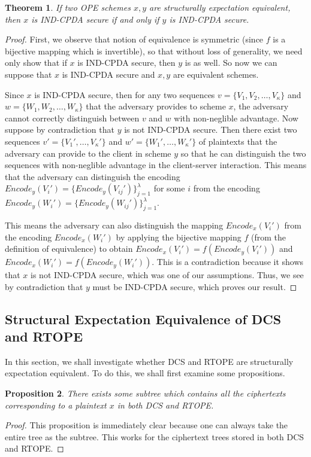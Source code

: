 \documentclass[12pt]{article}
\newtheorem{theorem}{Theorem}
\newtheorem{proposition}[theorem]{Proposition}
\begin{document}
\begin{theorem}
 If two OPE schemes $x,y$ are structurally expectation equivalent, then $x$ is IND-CPDA secure if and only if $y$ is IND-CPDA secure.
\end{theorem}
\begin{proof}
First, we observe that notion of equivalence is symmetric (since $f$ is a bijective mapping which is invertible), so that without loss of generality, we need only show that if $x$ is IND-CPDA secure, then $y$ is as well. So now we can suppose that $x$ is IND-CPDA secure and $x,y$ are equivalent schemes.

Since $x$ is IND-CPDA secure, then for any two sequences $v = \{V_1, V_2, \ldots, V_{\kappa}\}$ and $w = \{W_1, W_2, \ldots, W_{\kappa} \}$ that the adversary provides to scheme $x$, the adversary cannot correctly distinguish between $v$ and $w$ with non-neglible advantage. Now suppose by contradiction that $y$ is not IND-CPDA secure. Then there exist two sequences $v' = \{V_1', \ldots, V_{\kappa}'\}$ and $w' = \{W_1', \ldots, W_{\kappa}'\}$ of plaintexts that the adversary can provide to the client in scheme $y$ so that he can distinguish the two sequences with non-neglible advantage in the client-server interaction. This means that the adversary can distinguish the encoding $Encode_y(V_i') = \{Encode_y(V_{ij}') \}_{j=1}^{\lambda}$ for some $i$ from the encoding $Encode_y(W_i') = \{Encode_y(W_{ij}') \}_{j=1}^{\lambda}$.

This means the adversary can also distinguish the mapping $Encode_x(V_i')$ from the encoding $Encode_x(W_i')$ by applying the bijective mapping $f$ (from the definition of equivalence) to obtain $Encode_x(V_i') = f(Encode_y(V_i'))$ and $Encode_x(W_i') = f(Encode_y(W_i'))$. This is a contradiction because it shows that $x$ is not IND-CPDA secure, which was one of our assumptions. Thus, we see by contradiction that $y$ must be IND-CPDA secure, which proves our result.
\end{proof}

\subsection{Structural Expectation Equivalence of DCS and RTOPE}

In this section, we shall investigate whether DCS and RTOPE are structurally expectation equivalent. To do this, we shall first examine some propositions. \\

\begin{proposition}
 There exists some subtree which contains all the ciphertexts corresponding to a plaintext $x$ in both DCS and RTOPE.
\end{proposition}
\begin{proof}
  This proposition is immediately clear because one can always take the entire tree as the subtree. This works for the ciphertext trees stored in both DCS and RTOPE.
\end{proof}
\end{document}
